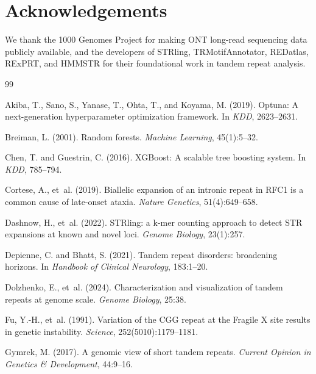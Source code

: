 \documentclass[11pt,twocolumn]{article}
\begin{document}
\section*{Acknowledgements}

We thank the 1000 Genomes Project for making ONT long-read sequencing
data publicly available, and the developers of STRling, TRMotifAnnotator,
REDatlas, RExPRT, and HMMSTR for their foundational work in tandem
repeat analysis.



\begin{thebibliography}{99}

Akiba, T., Sano, S., Yanase, T., Ohta, T., and Koyama, M. (2019).
Optuna: A next-generation hyperparameter optimization framework.
In \emph{KDD}, 2623--2631.

Breiman, L. (2001).
Random forests.
\emph{Machine Learning}, 45(1):5--32.

Chen, T. and Guestrin, C. (2016).
XGBoost: A scalable tree boosting system.
In \emph{KDD}, 785--794.

Cortese, A., et~al. (2019).
Biallelic expansion of an intronic repeat in RFC1 is a common cause of
late-onset ataxia.
\emph{Nature Genetics}, 51(4):649--658.

Dashnow, H., et~al. (2022).
STRling: a k-mer counting approach to detect STR expansions at known and
novel loci.
\emph{Genome Biology}, 23(1):257.

Depienne, C. and Bhatt, S. (2021).
Tandem repeat disorders: broadening horizons.
In \emph{Handbook of Clinical Neurology}, 183:1--20.

Dolzhenko, E., et~al. (2024).
Characterization and visualization of tandem repeats at genome scale.
\emph{Genome Biology}, 25:38.

Fu, Y.-H., et~al. (1991).
Variation of the CGG repeat at the Fragile X site results in genetic
instability.
\emph{Science}, 252(5010):1179--1181.

Gymrek, M. (2017).
A genomic view of short tandem repeats.
\emph{Current Opinion in Genetics \& Development}, 44:9--16.


\end{thebibliography}
\end{document}
